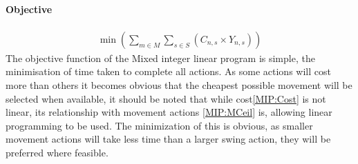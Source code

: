 \paragraph*{Objective}
\begin{align}
\label{MIP:OBJ}
\min\left(\sum_{m\in M}\sum_{s\in S} (C_{n,s}\times Y_{n,s})\right)
\end{align}
The objective function of the Mixed integer linear program is simple, the minimisation of time taken to complete all actions. As some actions will cost more than others it becomes obvious that the cheapest possible movement will be selected when available, it should be noted that while cost\ref{MIP:Cost} is not linear, its relationship with movement actions \ref{MIP:MCeil} is, allowing linear programming to be used. The minimization of this is obvious, as smaller movement actions will take less time than a larger swing action, they will be preferred where feasible. 
